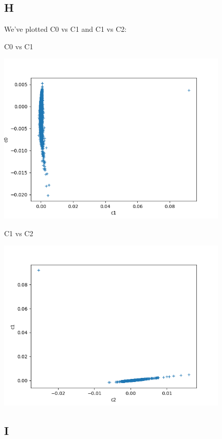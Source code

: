\documentclass[letterpaper,12pt]{article}
\begin{document}
\newpage



\subsection{H}

We've plotted C0 vs C1 and C1 vs C2:

\begin{table}[!h]
    \centering
    \caption{C0 vs C1}
    \includegraphics[width=11cm]{7-8-1.png}
\end{table}%

\begin{table}[!h]
    \centering
    \caption{C1 vs C2}
    \includegraphics[width=11cm]{7-8-2.png}
\end{table}%

\newpage

\subsection{I}
\end{document}
